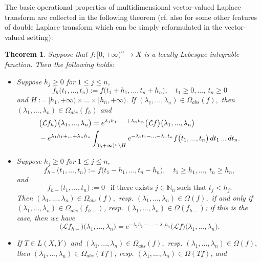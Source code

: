 \documentclass{amsart}
\newtheorem{thm}{Theorem}[section]
\theoremstyle{definition}
\theoremstyle{remark}
\numberwithin{equation}{section}
\begin{document}
The basic operational properties of multidimensional vector-valued Laplace transform are collected in the following theorem (cf. also \cite[Section 4]{bern1} for some other features of double Laplace transform which can be simply reformulated in the vector-valued setting):

\begin{thm}\label{opera}
Suppose that $f: [0,+\infty)^{n}\rightarrow X$ is a locally Lebesgue integrable function. Then the following holds:
\begin{itemize}
\item[(i)] Suppose $h_{j}\geq 0$ for $1\leq j\leq n$, 
$$
f_{h}\bigl(t_{1},...,t_{n}\bigr):=f\bigl(t_{1}+h_{1},...,t_{n}+h_{n}\bigr),\quad t_{1}\geq 0, ..., \ t_{n}\geq 0
$$
and $H:=[h_{1},+\infty) \times ... \times [h_{n},+\infty).$ If
$(\lambda_{1},...,\lambda_{n})\in \Omega_{abs}(f),$ then\\ $(\lambda_{1},...,\lambda_{n})\in \Omega_{abs}(f_{h})$  and 
\begin{align}\notag &\bigl({\mathcal Lf_{h}}\bigr)\bigl(\lambda_{1},...,\lambda_{n}\bigr)=e^{\lambda_{1}h_{1}+...+\lambda_{n}h_{n}}\bigl({\mathcal Lf}\bigr)\bigl(\lambda_{1},...,\lambda_{n}\bigr)
\\& \label{katas}-e^{\lambda_{1}h_{1}+...+\lambda_{n}h_{n}}\int_{[0,+\infty)^{n}\setminus H}e^{-\lambda_{1}t_{1}-...-\lambda_{n}t_{n}}f\bigl(t_{1},...,t_{n}\bigr)\, dt_{1}\, ...\, dt_{n}.
\end{align}
\item[(ii)] Suppose $h_{j}\geq 0$ for $1\leq j\leq n$, 
$$
f_{h-}\bigl(t_{1},...,t_{n}\bigr):=f\bigl(t_{1}-h_{1},...,t_{n}-h_{n}\bigr),\quad t_{1}\geq h_{1},  ..., \ t_{n}\geq h_{n},
$$ 
and 
$$
f_{h-}\bigl(t_{1},...,t_{n}\bigr):=0\ \ \mbox{ if there exists }j\in {\mathbb N}_{n} \ \mbox{such that }t_{j}<h_{j}.
$$ 
Then $(\lambda_{1},...,\lambda_{n})\in \Omega_{abs}(f),$ resp. $(\lambda_{1},...,\lambda_{n})\in \Omega(f),$ if and only if\\ $(\lambda_{1},...,\lambda_{n})\in \Omega_{abs}(f_{h-})$, resp. $(\lambda_{1},...,\lambda_{n})\in \Omega(f_{h-})$; if this is the case, then we have  
$$
\bigl({\mathcal Lf_{h-}}\bigr)\bigl(\lambda_{1},...,\lambda_{n}\bigr)=e^{-\lambda_{1}h_{1}-...-\lambda_{n}h_{n}}\bigl({\mathcal Lf}\bigr)\bigl(\lambda_{1},...,\lambda_{n}\bigr).
$$
\item[(iii)] If $T\in L(X,Y)$ and $(\lambda_{1},...,\lambda_{n})\in \Omega_{abs}(f),$ resp. $(\lambda_{1},...,\lambda_{n})\in \Omega(f),$ then $(\lambda_{1},...,\lambda_{n})\in \Omega_{abs}(Tf)$, resp. $(\lambda_{1},...,\lambda_{n})\in \Omega(Tf)$, and $$
$$
\end{itemize}
\end{thm}
\end{document}
